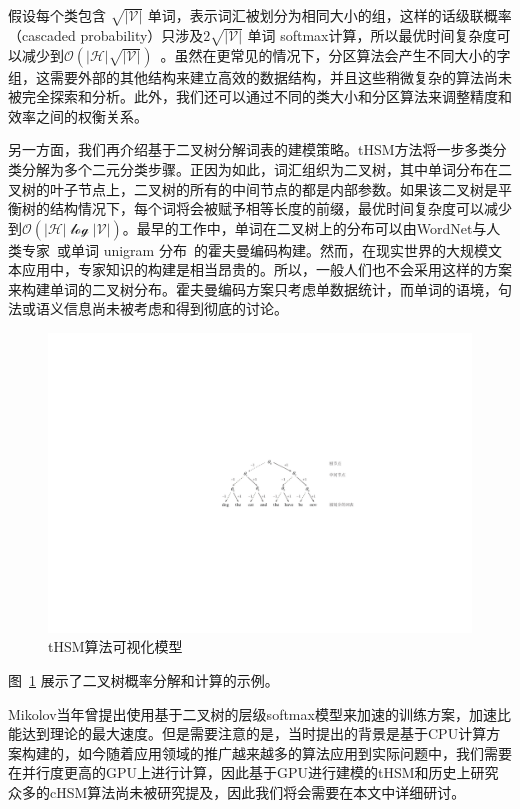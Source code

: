 假设每个类包含 $\sqrt{\mathcal{|V|}}$ 单词，表示词汇被划分为相同大小的组，这样的话级联概率（cascaded probability）只涉及$2\sqrt{\mathcal{|V|}}$ 单词 softmax计算，所以最优时间复杂度可以减少到$\mathcal{O}(\mathcal{|H|}\sqrt{\mathcal{|V|}})$~。虽然在更常见的情况下，分区算法会产生不同大小的字组，这需要外部的其他结构来建立高效的数据结构，并且这些稍微复杂的算法尚未被完全探索和分析。此外，我们还可以通过不同的类大小和分区算法来调整精度和效率之间的权衡关系。

另一方面，我们再介绍基于二叉树分解词表的建模策略。tHSM方法将一步多类分类分解为多个二元分类步骤。正因为如此，词汇组织为二叉树，其中单词分布在二叉树的叶子节点上，二叉树的所有的中间节点的都是内部参数。如果该二叉树是平衡树的结构情况下，每个词将会被赋予相等长度的前缀，最优时间复杂度可以减少到$\mathcal{O(|H|\log \mathcal{|V|})}$。最早的工作中，单词在二叉树上的分布可以由WordNet与人类专家~或单词 unigram 分布~的霍夫曼编码构建。然而，在现实世界的大规模文本应用中，专家知识的构建是相当昂贵的。所以，一般人们也不会采用这样的方案来构建单词的二叉树分布。霍夫曼编码方案只考虑单数据统计，而单词的语境，句法或语义信息尚未被考虑和得到彻底的讨论。

\begin{figure}[!h]
  \centering
\includegraphics[width=0.9\linewidth]{./figures/thsm-example.pdf}
\caption{tHSM算法可视化模型}\label{fig:case_thsm}
\end{figure}

图~\ref{fig:case_thsm} 展示了二叉树概率分解和计算的示例。

Mikolov当年曾提出使用基于二叉树的层级softmax模型来加速的训练方案，加速比能达到理论的最大速度。但是需要注意的是，当时提出的背景是基于CPU计算方案构建的，如今随着应用领域的推广越来越多的算法应用到实际问题中，我们需要在并行度更高的GPU上进行计算，因此基于GPU进行建模的tHSM和历史上研究众多的cHSM算法尚未被研究提及，因此我们将会需要在本文中详细研讨。

